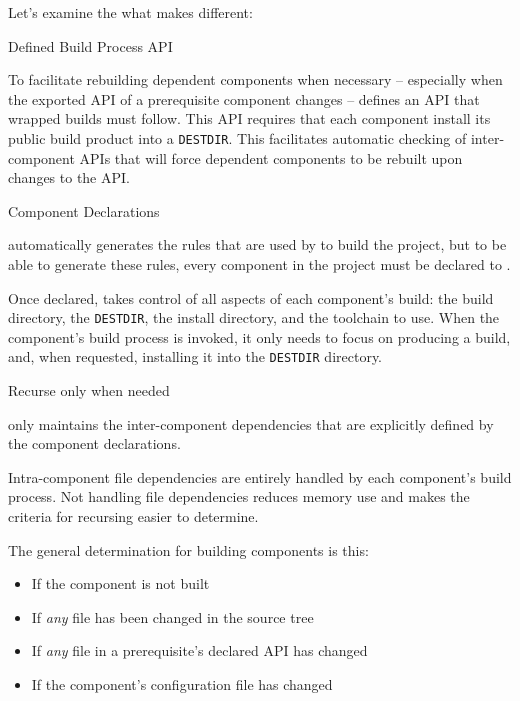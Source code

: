 Let's examine the what makes \lmsbw different:

\begin{description}
\item Defined Build Process API

  To facilitate rebuilding dependent components when necessary --
  especially when the exported API of a prerequisite component changes
  -- \lmsbw defines an API that wrapped builds must follow.  This API
  requires that each component install its public build product into a
  \texttt{DESTDIR}.  This facilitates automatic checking of
  inter-component APIs that will force dependent components to be
  rebuilt upon changes to the API.

\item Component Declarations

  \lmsbw automatically generates the rules that are used by \make to
  build the project, but to be able to generate these rules, every
  component in the project must be declared to \lmsbw.

  Once declared, \lmsbw takes control of all aspects of each
  component's build: the build directory, the \texttt{DESTDIR}, the
  install directory, and the toolchain to use.  When the component's
  build process is invoked, it only needs to focus on producing a
  build, and, when requested, installing it into the \texttt{DESTDIR}
  directory.

\item Recurse only when needed\label{intro:build-component-criteria}

  \lmsbw only maintains the inter-component dependencies that are
  explicitly defined by the component declarations.

  Intra-component file dependencies are entirely handled by each
  component's build process.  Not handling file dependencies reduces
  memory use and makes the criteria for recursing easier to determine.

  The general determination for building components is this:

  \begin{itemize}
  \item If the component is not built
  \item If \emph{any} file has been changed in the source tree
  \item If \emph{any} file in a prerequisite's declared API has
    changed
  \item If the component's configuration file has changed
  \end{itemize}


\end{description}
